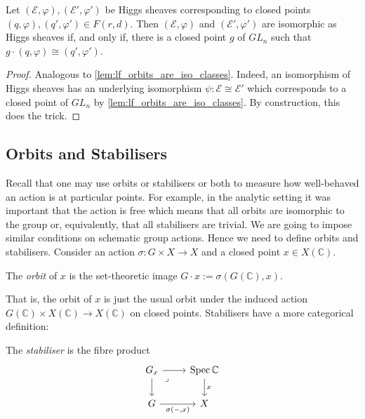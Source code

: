 \documentclass[12pt]{ociamthesis}  %
\begin{document}
\begin{lemma}\label{lem:higgs_orbits_are_iso_classes}
  Let $(\mathscr E,\varphi),(\mathscr E',\varphi')$ be Higgs sheaves
  corresponding to closed points $(q,\varphi),(q',\varphi')\in F(r,d)$.
  Then $(\mathscr E,\varphi)$ and $(\mathscr E',\varphi')$ are isomorphic
  as Higgs sheaves if, and only if, there is a closed point $g$ of $GL_n$
  such that $g\cdot (q,\varphi) \cong (q',\varphi')$.
  \begin{proof}
    Analogous to \ref{lem:lf_orbits_are_iso_classes}. Indeed, an isomorphism
    of Higgs sheaves has an underlying isomorphism $\psi : \mathscr E \cong \mathscr E'$
    which corresponds to a closed point of $GL_n$ by
    \ref{lem:lf_orbits_are_iso_classes}. By construction, this does the
    trick.
  \end{proof}
\end{lemma}

\subsection{Orbits and Stabilisers}

Recall that one may use orbits or stabilisers or both to measure
how well-behaved an action is at particular points. For example,
in the analytic setting it was important that the action is free
which means that all orbits are isomorphic to the group
or, equivalently, that all stabilisers are trivial.
We are going to impose similar conditions on schematic
group actions. Hence we need to define orbits and stabilisers.
Consider an action $\sigma : G\times X\to X$ and a closed point
$x \in X(\mathbb C)$.

\begin{definition}
  The \emph{orbit} of $x$ is the set-theoretic image
  $G\cdot x := \sigma(G(\mathbb C),x)$.
\end{definition}

That is, the orbit of $x$ is just the usual orbit under the induced
action $G(\mathbb C)\times X(\mathbb C) \to X(\mathbb C)$ on closed
points. Stabilisers have a more categorical definition:

\begin{definition}
  The \emph{stabiliser} is the fibre product
  \begin{equation*}
    \begin{tikzcd}
      {G_x} & {\Spec\mathbb  C} \\
      G & X
      \arrow[from=1-1, to=1-2]
      \arrow[from=1-1, to=2-1]
      \arrow["\lrcorner"{anchor=center, pos=0.125}, draw=none, from=1-1, to=2-2]
      \arrow["x", from=1-2, to=2-2]
      \arrow["{\sigma(-,x)}"', from=2-1, to=2-2]
    \end{tikzcd}
  \end{equation*}
\end{definition}
\end{document}
